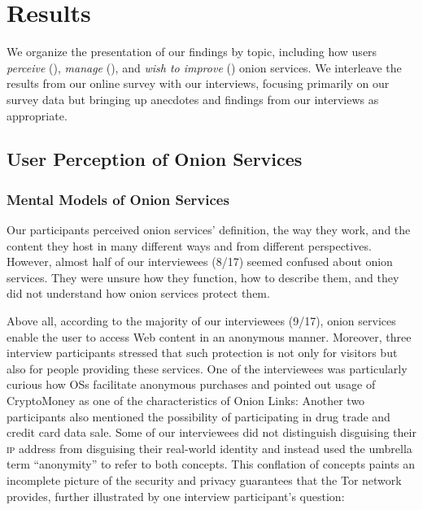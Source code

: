\section{Results}
\label{sec:results}

We organize the presentation of our findings by topic, including how users
\emph{perceive} (), \emph{manage} (), and
\emph{wish to improve} () onion services.  We interleave the
results from our online survey with our interviews, focusing primarily on our
survey data but bringing up anecdotes and findings from our interviews as
appropriate.

\subsection{User Perception of Onion Services}
\label{sec:perception}

\subsubsection{Mental Models of Onion Services}

Our participants perceived onion services' definition, the way they work, and
the content they host in many different ways and from different perspectives.
However, almost half of our interviewees (8/17) seemed confused about onion
services.  They were unsure how they function, how to describe them, and they
did not understand how onion services protect them.

Above all, according to the majority of our interviewees (9/17), onion services
enable the user to access Web content in an anonymous manner.  Moreover, three
interview participants stressed that such protection is not only for visitors
but also for people providing these services.  One of the interviewees was
particularly curious how OSs facilitate anonymous purchases and pointed out
usage of CryptoMoney as one of the characteristics of Onion Links:
  Another two participants also mentioned
the possibility of participating in drug trade and credit card data sale.  Some
of our interviewees did not distinguish disguising their \textsc{ip} address
from disguising their real-world identity and instead used the umbrella term
``anonymity'' to refer to both concepts.  This conflation of concepts paints an
incomplete picture of the security and privacy guarantees that the Tor network
provides, further illustrated by one interview participant's question:

